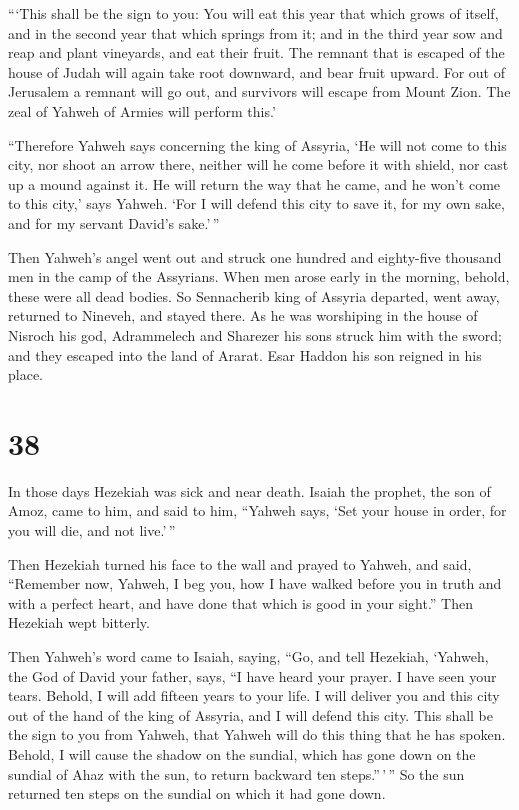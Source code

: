  ```This shall be the sign to you: You will eat this year
that which grows of itself, and in the second year that which springs
from it; and in the third year sow and reap and plant vineyards, and eat
their fruit.  The remnant that is escaped of the house of
Judah will again take root downward, and bear fruit upward.
 For out of Jerusalem a remnant will go out, and survivors
will escape from Mount Zion. The zeal of Yahweh of Armies will perform
this.'

 ``Therefore Yahweh says concerning the king of Assyria,
`He will not come to this city, nor shoot an arrow there, neither will
he come before it with shield, nor cast up a mound against it.
 He will return the way that he came, and he won't come to
this city,' says Yahweh.  `For I will defend this city to
save it, for my own sake, and for my servant David's sake.'\,''

 Then Yahweh's angel went out and struck one hundred and
eighty-five thousand men in the camp of the Assyrians. When men arose
early in the morning, behold, these were all dead bodies. 
So Sennacherib king of Assyria departed, went away, returned to Nineveh,
and stayed there.  As he was worshiping in the house of
Nisroch his god, Adrammelech and Sharezer his sons struck him with the
sword; and they escaped into the land of Ararat. Esar Haddon his son
reigned in his place.

\hypertarget{section-36}{%
\section{38}\label{section-36}}

 In those days Hezekiah was sick and near death. Isaiah the
prophet, the son of Amoz, came to him, and said to him, ``Yahweh says,
`Set your house in order, for you will die, and not live.'\,''

 Then Hezekiah turned his face to the wall and prayed to
Yahweh,  and said, ``Remember now, Yahweh, I beg you, how I
have walked before you in truth and with a perfect heart, and have done
that which is good in your sight.'' Then Hezekiah wept bitterly.

 Then Yahweh's word came to Isaiah, saying, 
``Go, and tell Hezekiah, `Yahweh, the God of David your father, says,
``I have heard your prayer. I have seen your tears. Behold, I will add
fifteen years to your life.  I will deliver you and this
city out of the hand of the king of Assyria, and I will defend this
city.  This shall be the sign to you from Yahweh, that
Yahweh will do this thing that he has spoken.  Behold, I
will cause the shadow on the sundial, which has gone down on the sundial
of Ahaz with the sun, to return backward ten steps.''\,'\,'' So the sun
returned ten steps on the sundial on which it had gone down.

